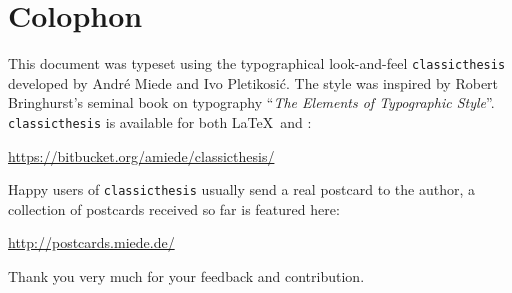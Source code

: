 \pagestyle{empty}
\hfill
\vfill
{}
\section*{Colophon}
This document was typeset using the typographical look-and-feel \texttt{classicthesis} developed by Andr\'e Miede and Ivo Pletikosić.
The style was inspired by Robert Bringhurst's seminal book on typography ``\emph{The Elements of Typographic Style}''.
\texttt{classicthesis} is available for both \LaTeX\ and \mLyX:
\begin{center}
	\url{https://bitbucket.org/amiede/classicthesis/}
\end{center}
Happy users of \texttt{classicthesis} usually send a real postcard to the author, a collection of postcards received so far is featured here:
\begin{center}
	\url{http://postcards.miede.de/}
\end{center}
Thank you very much for your feedback and contribution.
\bigskip
\noindent\finalVersionString
